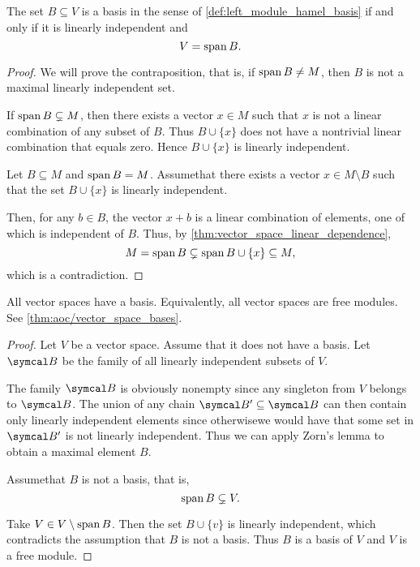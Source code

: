 \begin{proposition}\label{thm:vector_space_basis}
  The set \( B \subseteq V \) is a basis in the sense of \cref{def:left_module_hamel_basis} if and only if it is linearly independent and
  \begin{equation*}
    V = \operatorname{span}{B}.
  \end{equation*}
\end{proposition}
\begin{proof}
  \Implies We will prove the contraposition, that is, if \( \operatorname{span}{B} \neq M \), then \( B \) is not a maximal linearly independent set.

  If \( \operatorname{span}{B} \subsetneq M \), then there exists a vector \( x \in M \) such that \( x \) is not a linear combination of any subset of \( B \). Thus \( B \cup \{ x \} \) does not have a nontrivial linear combination that equals zero. Hence \( B \cup \{ x \} \) is linearly independent.

  \ImpliedBy Let \( B \subseteq M \) and \( \operatorname{span}{B} = M \). Assume\LEM that there exists a vector \( x \in M \setminus B \) such that the set \( B \cup \{ x \} \) is linearly independent.

  Then, for any \( b \in B \), the vector \( x + b \) is a linear combination of elements, one of which is independent of \( B \). Thus, by \cref{thm:vector_space_linear_dependence},
  \begin{equation*}
    M = \operatorname{span}{B} \subsetneq \operatorname{span}{B \cup \{ x \}} \subseteq M,
  \end{equation*}
  which is a contradiction.
\end{proof}

\begin{theorem}\label{thm:all_vector_spaces_are_free_left_modules}
  All vector spaces have a basis. Equivalently, all vector spaces are free modules. See \cref{thm:aoc/vector_space_bases}.
\end{theorem}
\begin{proof}
  Let \( V \) be a vector space. Assume that it does not have a basis. Let \( \Cal{B} \) be the family of all linearly independent subsets of \( V \).

  The family \( \Cal{B} \) is obviously nonempty since any singleton from \( V \) belongs to \( \Cal{B} \). The union of any chain \( \Cal{B}' \subseteq \Cal{B} \) can then contain only linearly independent elements since otherwise\LEM we would have that some set in \( \Cal{B}' \) is not linearly independent. Thus we can apply Zorn's lemma to obtain a maximal element \( B \).

  Assume\LEM that \( B \) is not a basis, that is,
  \begin{equation*}
    \operatorname{span} B \subsetneq V.
  \end{equation*}

  Take \( V \in V \setminus \operatorname{span} B \). Then the set \( B \cup \{ v \} \) is linearly independent, which contradicts the assumption that \( B \) is not a basis. Thus \( B \) is a basis of \( V \) and \( V \) is a free module.
\end{proof}

